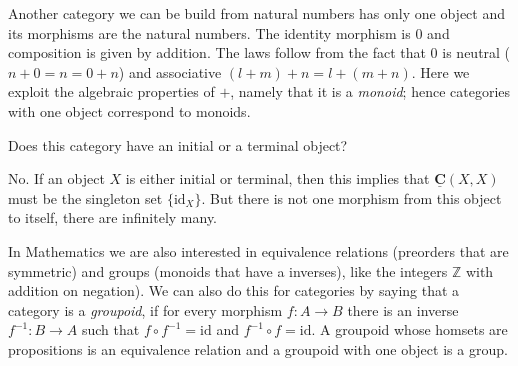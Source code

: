 \documentclass{article}
\newcommand{\cat}[1]{\underline{\mathbf{#1}}}
\newcommand{\id}{\mathrm{id}}
\newcommand{\Int}{\mathbb{Z}}
\begin{document}
Another category we can be build from natural numbers has only one object and its morphisms are the natural numbers. The identity morphism is $0$ and composition is given by addition. The laws follow from the fact that $0$ is neutral ($n+0 = n = 0+n$) and associative $(l+m)+n = l+(m+n)$. Here we exploit the algebraic properties of $+$, namely that it is a \emph{monoid}; hence categories with one object correspond to monoids.

\begin{Exercise}
  Does this category have an initial or a terminal object? 
\end{Exercise}
\begin{Answer}
  No. If an object $X$ is either initial or terminal, then this implies that $\cat{C}(X,X)$ must be the singleton set $\{\id_X\}$. But there is not one morphism from this object to itself, there are infinitely many.
\end{Answer}

In Mathematics we are also interested in equivalence relations (preorders that are symmetric) and groups (monoids that have a inverses), like the integers $\Int$ with addition on negation). We can also do this for categories by saying that a category is a \emph{groupoid}, if for every morphism $f : A \to B$ there is an inverse $f^{-1} : B \to A$ such that $f \circ f^{-1} = \id$ and $f^{-1} \circ f = \id$. A groupoid whose homsets are propositions is an equivalence relation and a groupoid with one object is a group.
\end{document}

